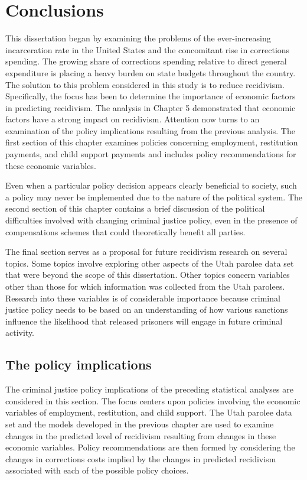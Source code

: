 \chapter{Conclusions}

This dissertation began by examining the problems of the ever-increasing incarceration rate in the United States and the concomitant rise in corrections spending.  The growing share of corrections spending relative to direct general expenditure is placing a heavy burden on state budgets throughout the country.  The solution to this problem considered in this study is to reduce recidivism.  Specifically, the focus has been to determine the importance of economic factors in predicting recidivism.  The analysis in Chapter 5 demonstrated that economic factors have a strong impact on recidivism.  Attention now turns to an examination of the policy implications resulting from the previous analysis. The first section of this chapter examines policies concerning employment, restitution payments, and child support payments and includes policy recommendations for these economic variables.

Even when a particular policy decision appears clearly beneficial to society, such a policy may never be implemented due to the nature of the political system.  The second section of this chapter contains a brief discussion of the political difficulties involved with changing criminal justice policy, even in the presence of compensations schemes that could theoretically benefit all parties.

The final section serves as a proposal for future recidivism research on several topics.  Some topics involve exploring other aspects of the Utah parolee data set that were beyond the scope of this dissertation.  Other topics concern variables other than those for which information was collected from the Utah parolees.  Research into these variables is of considerable importance because criminal justice policy needs to be based on an understanding of how various sanctions influence the likelihood that released prisoners will engage in future criminal activity.

\section{The policy implications}

The criminal justice policy implications of the preceding statistical analyses are considered in this section.  The focus centers upon policies involving the economic variables of employment, restitution, and child support.  The Utah parolee data set and the models developed in the previous chapter are used to examine changes in the predicted level of recidivism resulting from changes in these economic variables.  Policy recommendations are then formed by considering the changes in corrections costs implied by the changes in predicted recidivism associated with each of the possible policy choices.


